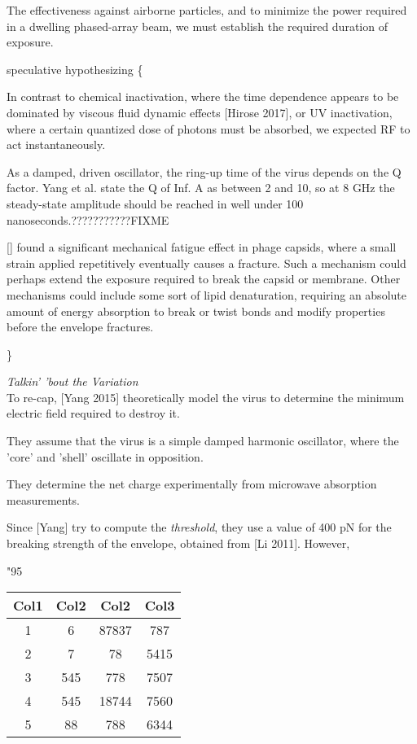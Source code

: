 \documentclass[fleqn,10pt]{article}
\begin{document}
The effectiveness against airborne particles, and to minimize the power required in a dwelling phased-array beam, we must establish the required duration of exposure.

{\color{red} speculative hypothesizing \{ } 

In contrast to chemical inactivation, where the time dependence appears to be dominated by viscous fluid dynamic effects [Hirose 2017], or UV inactivation, where a certain quantized dose of photons must be absorbed, we expected RF to act instantaneously.

As a damped, driven oscillator, the ring-up time of the virus depends on the Q factor. Yang et al. state the Q of Inf. A as between 2 and 10, so at 8 GHz the steady-state amplitude should be reached in well under 100 nanoseconds.???????????FIXME

[] found a significant mechanical fatigue effect in phage capsids, where a small strain applied repetitively eventually causes a fracture. Such a mechanism could perhaps extend the exposure required to break the capsid or membrane. Other mechanisms could include some sort of lipid denaturation, requiring an absolute amount of energy absorption to break or twist bonds and modify properties before the envelope fractures.


{\color{red}  \} } 




\clearpage
{\Large \it Talkin' 'bout the Variation}\\

To re-cap, [Yang 2015] theoretically model the virus to determine the minimum electric field required to destroy it. 

They assume that the virus is a simple damped harmonic oscillator, where the 'core' and 'shell' oscillate in opposition. 

They determine the net charge experimentally from microwave absorption measurements.

Since [Yang] try to compute the {\it threshold}, they use a value of 400 pN for the breaking strength of the envelope, obtained from [Li 2011]. However,  

"95%

\begin{center}
 \begin{tabular}{||c c c c||} 
 \hline
 Col1 & Col2 & Col2 & Col3 \\ [0.5ex] 
 \hline\hline
 1 & 6 & 87837 & 787 \\ 
 \hline
 2 & 7 & 78 & 5415 \\
 \hline
 3 & 545 & 778 & 7507 \\
 \hline
 4 & 545 & 18744 & 7560 \\
 \hline
 5 & 88 & 788 & 6344 \\ [1ex] 
 \hline
\end{tabular}
\end{center}
\end{document}
